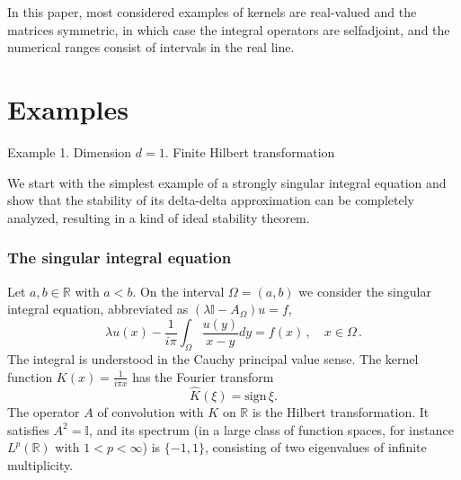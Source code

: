 \documentclass[12pt]{amsart}
\makeatletter
\def\subsection{\@startsection{section}{1}%
  \z@{1.2\linespacing\@plus\linespacing}{.5\linespacing}%
  {\normalfont\scshape\centering}}
\def\subsection{\@startsection{subsection}{2}%
  \z@{0.9\linespacing\@plus.7\linespacing}{-.5em}%
  {\normalfont\bfseries}}
\theoremstyle{definition}
\theoremstyle{remark}
\numberwithin{equation}{section}
\newcommand\R{{\mathbb R}}
\newcommand {\Id}{\mathbb I}
\newcommand{\sign}{\mathrm{sign}}
\let\hat=\widehat
\makeatother
\begin{document}
 In this paper, most considered examples of kernels are real-valued and the matrices symmetric, in which case the integral operators are selfadjoint, and the numerical ranges consist of intervals in the real line.  


\section{Examples}\label{S:Examples}

\label{Ex:1}
\subsection{Example 1. Dimension $d=1$. Finite Hilbert transformation}\label{SS:1d}\ 

We start with the simplest example of a strongly singular integral equation and show that the stability of its delta-delta approximation can be completely analyzed, resulting in a kind of ideal stability theorem.

\subsubsection{The singular integral equation}\label{SS:SIE1D}
Let $a,b\in\R$ with $a<b$. On the interval $\Omega=(a,b)$ we consider the singular integral equation, abbreviated as  $(\lambda\Id-A_{\Omega})u=f$,
\begin{equation}
\label{E:IE1D}
 \lambda u(x) - \frac1{i\pi}\int_{\Omega}\frac{u(y)}{x-y}dy = f(x)\,,\quad x\in\Omega\,.
\end{equation}
The integral is understood in the Cauchy principal value sense. 
The kernel function $K(x)=\frac1{i\pi x}$ has the Fourier transform
$$
 \hat K(\xi)=\sign\,\xi.
$$
The operator $A$ of convolution with $K$ on $\R$ is the Hilbert transformation. It satisfies $A^{2}=\Id$, and its spectrum (in a large class of function spaces, for instance $L^{p}(\R)$ with $1<p<\infty$) is $\{-1,1\}$, consisting of two eigenvalues of infinite multiplicity. 
\end{document}
